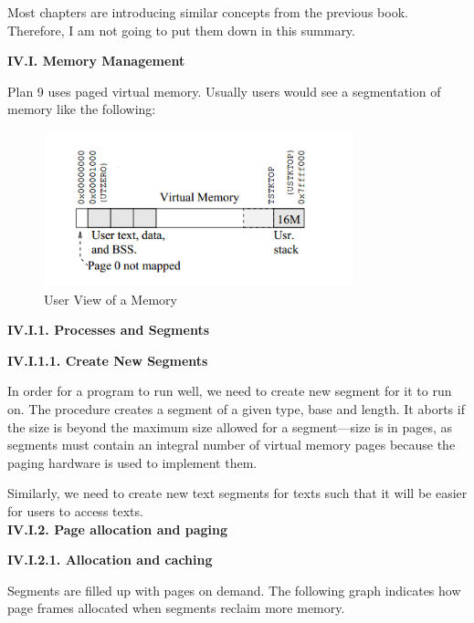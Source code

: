 \documentclass[a4paper,12pt]{report}
\begin{document}
Most chapters are introducing similar concepts from the previous book. Therefore, I am not going to put them down in this summary.

\noindent
\textbf{IV.I. Memory Management}

\noindent
Plan 9 uses paged virtual memory. Usually users would see a segmentation of memory like the following:

\begin{figure}[h]
\centering	
\includegraphics[width=9cm, height=4.5cm]{"pic3"}
\caption{User View of a Memory}
\end{figure}

\noindent 
\textbf{IV.I.1. Processes and Segments}

\noindent
\textbf{IV.I.1.1. Create New Segments}

\noindent
In order for a program to run well, we need to create new segment for it to run on. The procedure creates a segment of a given type, base and length. It aborts if the size is beyond the maximum size allowed for a segment—size is in pages, as segments must contain an integral number of virtual memory pages because the paging hardware is used to implement them.

\noindent
Similarly, we need to create new text segments for texts such that it will be easier for users to access texts. \\

\noindent
\textbf{IV.I.2. Page allocation and paging}

\noindent
\textbf{IV.I.2.1. Allocation and caching}

\noindent
Segments are filled up with pages on demand. The following graph indicates how page frames allocated when segments reclaim more memory.
\end{document}
